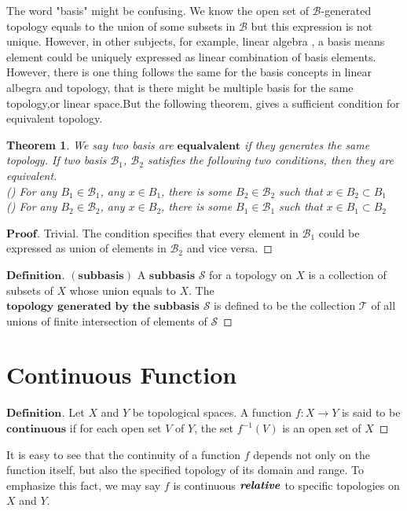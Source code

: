 \documentclass[a4paper, 11pt]{article}
\newtheorem{theorem}{Theorem}
\theoremstyle{remark}
\newenvironment{myprf}
{\renewcommand\qedsymbol{$ $}\begin{proof}[$\mathbf{Proof}$]}
  {\end{proof}}
\newenvironment{mydef}
{\renewcommand\qedsymbol{$ $}\begin{proof}[$\mathbf{Definition}$]}
  {\end{proof}}
\theoremstyle{definition}
\begin{document}
\indent The word "basis" might be confusing. We know the open set of $\mathcal{B}$-generated topology equals to the union of some subsets in $\mathcal{B}$ but this
expression is not unique. However, in other subjects, for example, linear algebra
,  a basis means element could be uniquely expressed as linear combination of basis elements.\\
\indent
However, there is one thing follows the same for the basis concepts in linear 
albegra and topology, that is there might be multiple basis for the same topology,or linear space.But the following theorem, gives a sufficient condition for 
equivalent topology.
\vspace{0.5cm}
\begin{theorem}
        We say two basis are $\textbf{equalvalent}$ if they generates the same
        topology. If two basis $\mathcal{B}_1$, $\mathcal{B}_2$ satisfies the 
        following two conditions, then they are equivalent.\\
        () For any $B_1\in \mathcal{B}_1$, any $x\in B_1$, there
        is some $B_2\in \mathcal{B}_2$ such that $x\in B_2\subset B_1$\\
        () For any $B_2\in \mathcal{B}_2$, any $x\in B_2$, there
        is some $B_1\in \mathcal{B}_1$ such that $x\in B_1\subset B_2$\\
\end{theorem}
\begin{myprf}
        Trivial. The condition specifies that every element in $\mathcal{B}_1$ 
        could be expressed as union of elements in $\mathcal{B}_2$ and vice versa.
\end{myprf}
\vspace{0.5cm}
\begin{mydef}$(\textbf{subbasis})$ A $\textbf{subbasis}$ $\mathcal{S}$
        for a topology on $X$
        is a collection of subsets of $X$ whose union equals to $X$. The
        $\textbf{topology generated by the subbasis}$ $\mathcal{S}$ is defined
        to be the collection $\mathcal{T}$ of all unions of finite intersection
        of elements of $\mathcal{S}$
        
\end{mydef}

\section{Continuous Function}
\begin{mydef}
       Let $X$ and $Y$ be topological spaces. A function $f:X\rightarrow Y$ is
       said to be $\textbf{continuous}$ if for each open set $V$ of $Y$, 
       the set $f^{-1}(V)$ is an open set of $X$
\end{mydef}
It is easy to see that the continuity of a function $f$ depends not only on the
function itself, but also the specified topology of its domain and range. To 
emphasize this fact, we may say $f$ is continuous $\textbf{\textit{relative}}$ to specific topologies on $X$ and $Y$.
\end{document}

